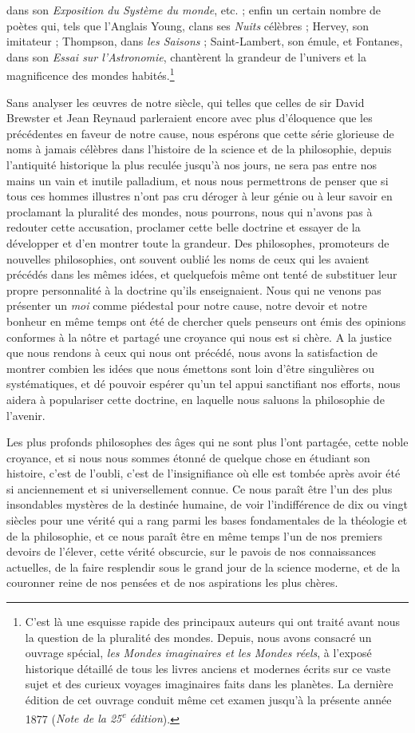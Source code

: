 \documentclass[a4paper, 11pt, oneside, landscape]{article}
\begin{document}
dans son \emph{Exposition du Système du monde}, etc. ; enfin un certain nombre de poètes qui, tels que l'Anglais Young, clans ses \emph{Nuits} célèbres ; Hervey, son imitateur ; Thompson, dans \emph{les Saisons} ; Saint-Lambert, son émule, et Fontanes, dans son \emph{Essai sur l'Astronomie}, chantèrent la grandeur de l'univers et la magnificence des mondes habités.\footnote{C'est là une esquisse rapide des principaux auteurs qui ont traité avant nous la question de la pluralité des mondes. Depuis, nous avons consacré un ouvrage spécial, \emph{les Mondes imaginaires et les Mondes réels}, à l'exposé historique détaillé de tous les livres anciens et modernes écrits sur ce vaste sujet et des curieux voyages imaginaires faits dans les planètes. La dernière édition de cet ouvrage conduit même cet examen jusqu'à la présente année 1877 (\emph{Note de la 25\textsuperscript{e} édition}).}

Sans analyser les œuvres de notre siècle, qui telles que celles de sir David Brewster et Jean Reynaud parleraient encore avec plus d'éloquence que les précédentes en faveur de notre cause, nous espérons que cette série glorieuse de noms à jamais célèbres dans l'histoire de la science et de la philosophie, depuis l'antiquité historique la plus reculée jusqu'à nos jours, ne sera pas entre nos mains un vain et inutile palladium, et nous nous permettrons de penser que si tous ces hommes illustres n'ont pas cru déroger à leur génie ou à leur savoir en proclamant la pluralité des mondes, nous pourrons, nous qui n'avons pas à redouter cette accusation, proclamer cette belle doctrine et essayer de la développer et d'en montrer toute la grandeur. Des philosophes, promoteurs de nouvelles philosophies, ont souvent oublié les noms de ceux qui les avaient précédés dans les mêmes idées, et quelquefois même ont tenté de substituer leur propre personnalité à la doctrine qu'ils enseignaient. Nous qui ne venons pas présenter un \emph{moi} comme piédestal pour notre cause, notre devoir et notre bonheur en même temps ont été de chercher quels penseurs ont émis des opinions conformes à la nôtre et partagé une croyance qui nous est si chère. A la justice que nous rendons à ceux qui nous ont précédé, nous avons la satisfaction de montrer combien les idées que nous émettons sont loin d'être singulières ou systématiques, et dé pouvoir espérer qu'un tel appui sanctifiant nos efforts, nous aidera à populariser cette doctrine, en laquelle nous saluons la philosophie de l'avenir.

Les plus profonds philosophes des âges qui ne sont plus l'ont partagée, cette noble croyance, et si nous nous sommes étonné de quelque chose en étudiant son histoire, c'est de l'oubli, c'est de l'insignifiance où elle est tombée après avoir été si anciennement et si universellement connue. Ce nous paraît être l'un des plus insondables mystères de la destinée humaine, de voir l'indifférence de dix ou vingt siècles pour une vérité qui a rang parmi les bases fondamentales de la théologie et de la philosophie, et ce nous paraît être en même temps l'un de nos premiers devoirs de l'élever, cette vérité obscurcie, sur le pavois de nos connaissances actuelles, de la faire resplendir sous le grand jour de la science moderne, et de la couronner reine de nos pensées et de nos aspirations les plus chères.
\end{document}
